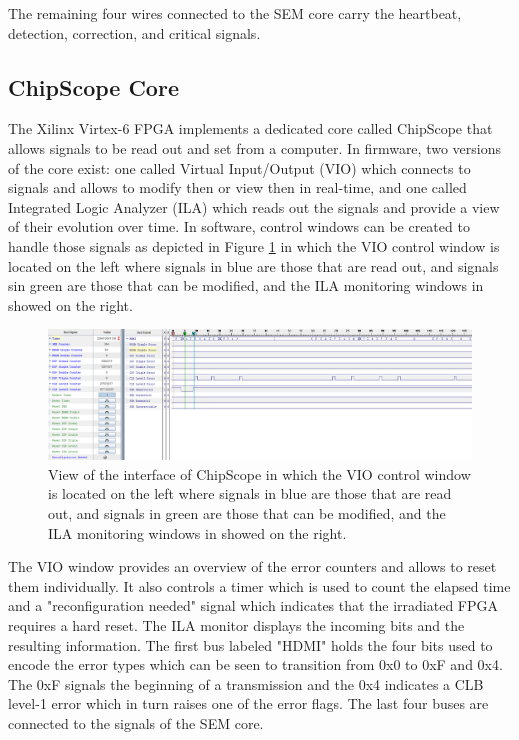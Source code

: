       The remaining four wires connected to the SEM core carry the heartbeat, detection, correction, and critical signals.

    \subsection{ChipScope Core}

      The Xilinx Virtex-6 FPGA implements a dedicated core called ChipScope that allows signals to be read out and set from a computer. In firmware, two versions of the core exist: one called Virtual Input/Output (VIO) which connects to signals and allows to modify then or view then in real-time, and one called Integrated Logic Analyzer (ILA) which reads out the signals and provide a view of their evolution over time. In software, control windows can be created to handle those signals as depicted in Figure \ref{fig:II-5-cs-clb} in which the VIO control window is located on the left where signals in blue are those that are read out, and signals sin green are those that can be modified, and the ILA monitoring windows in showed on the right. \\

      \begin{figure}
        \centering
        \includegraphics[width=\textwidth]{img/II-5-irradiation/cs-clb.png}
        \caption{View of the interface of ChipScope in which the VIO control window is located on the left where signals in blue are those that are read out, and signals in green are those that can be modified, and the ILA monitoring windows in showed on the right.}
        \label{fig:II-5-cs-clb}
      \end{figure}

      The VIO window provides an overview of the error counters and allows to reset them individually. It also controls a timer which is used to count the elapsed time and a "reconfiguration needed" signal which indicates that the irradiated FPGA requires a hard reset. The ILA monitor displays the incoming bits and the resulting information. The first bus labeled "HDMI" holds the four bits used to encode the error types which can be seen to transition from 0x0 to 0xF and 0x4. The 0xF signals the beginning of a transmission and the 0x4 indicates a CLB level-1 error which in turn raises one of the error flags. The last four buses are connected to the signals of the SEM core.

